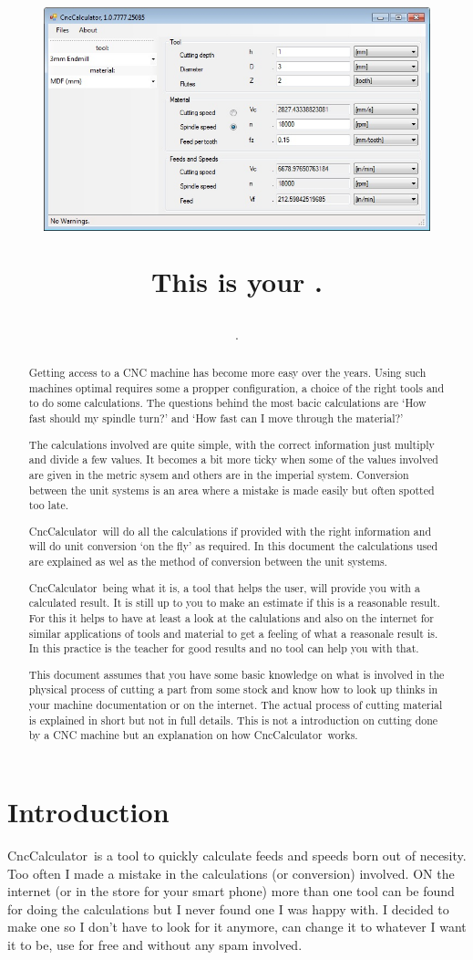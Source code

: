 \documentclass[10pt,a4paper,twoside]{report}
\author{\Author.}
\title{
	\begin{figure}[h!]
		\centering
		\includegraphics[width=0.6\linewidth]{../../CncCalculator_screenshot1.jpg}
	\end{figure}	
	This is your \CC.
}
\newcommand{\CC}{CncCalculator}
\begin{document}
	\maketitle
	\pagebreak\begin{abstract}		
	Getting access to a CNC machine has become more easy over the years.
	Using such machines optimal requires some a propper configuration, a choice of the right tools
	and to do some calculations. The questions behind the most bacic calculations are `How fast should
	my spindle turn?' and `How fast can I move through the material?'
	
	The calculations involved are quite simple, with the correct information just multiply and divide
	a few values. It becomes a bit more ticky when some of the values involved are given in 
	the metric sysem and others are in the imperial system. Conversion between the unit systems is
	an area where a mistake is made easily but often spotted too late.
	
	\CC\ will do all the calculations if provided with the right information and will do
	unit conversion `on the fly' as required. In this document the calculations used are explained
	as wel as the method of conversion between the unit systems.
	
	\CC\ being what it is, a tool that helps the user, will provide you with a calculated
	result. It is still up to you to make an estimate if this is a reasonable result. For this it
	helps to have at least a look at the calulations and also on the internet for similar applications
	of tools and material to get a feeling of what a reasonale result is. In this practice is the
	teacher for good results and no tool can help you with that.
	
	This document assumes that you have some basic knowledge on what is involved in the physical process
	of cutting a part from some stock and know how to look up thinks in your machine documentation or
	on the internet. The actual process of cutting material is explained in short but not in full details.
	This is not a introduction on cutting done by a CNC machine but an explanation on how \CC\ works.
	\end{abstract}
	\pagestyle{headings}
	\tableofcontents
	\listoffigures
	\newpage{}\setcounter{page}{1}%
	\chapter{Introduction}
	\CC\ is a tool to quickly calculate feeds and speeds born out of necesity. Too often I made a mistake
	in the calculations (or conversion) involved. ON the internet (or in the store for your smart phone) 
	more than one tool can be found for doing the calculations but I never found one I was happy with.
	I decided to make one so I don't have to look for it anymore, can change it to whatever I want it to be,
	use for free and without any spam involved.
	
\end{document}
